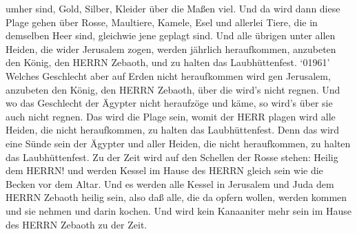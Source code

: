 umher sind, Gold, Silber, Kleider über die Maßen viel.  Und
da wird dann diese Plage gehen über Rosse, Maultiere, Kamele, Esel und
allerlei Tiere, die in demselben Heer sind, gleichwie jene geplagt sind.
 Und alle übrigen unter allen Heiden, die wider Jerusalem
zogen, werden jährlich heraufkommen, anzubeten den König, den HERRN
Zebaoth, und zu halten das Laubhüttenfest.  `01961' Welches
Geschlecht aber auf Erden nicht heraufkommen wird gen Jerusalem,
anzubeten den König, den HERRN Zebaoth, über die wird's nicht regnen.
 Und wo das Geschlecht der Ägypter nicht heraufzöge und
käme, so wird's über sie auch nicht regnen. Das wird die Plage sein,
womit der HERR plagen wird alle Heiden, die nicht heraufkommen, zu
halten das Laubhüttenfest.  Denn das wird eine Sünde sein
der Ägypter und aller Heiden, die nicht heraufkommen, zu halten das
Laubhüttenfest.  Zu der Zeit wird auf den Schellen der
Rosse stehen: Heilig dem HERRN! und werden Kessel im Hause des HERRN
gleich sein wie die Becken vor dem Altar.  Und es werden
alle Kessel in Jerusalem und Juda dem HERRN Zebaoth heilig sein, also
daß alle, die da opfern wollen, werden kommen und sie nehmen und darin
kochen. Und wird kein Kanaaniter mehr sein im Hause des HERRN Zebaoth zu
der Zeit.
